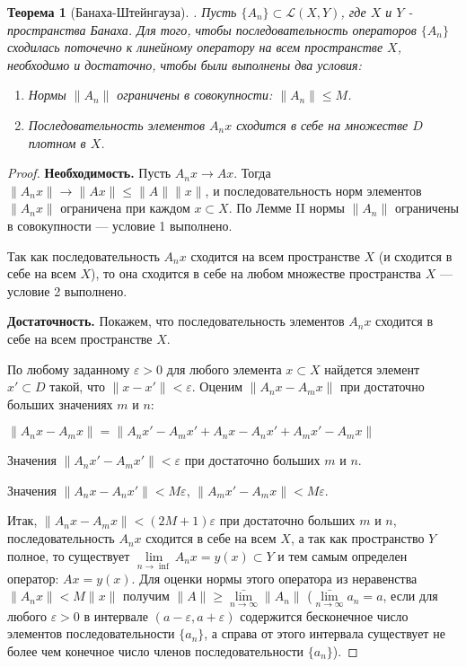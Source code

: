\documentclass[12pt,a4paper,titlepage]{book}
\theoremstyle{definition}
\theoremstyle{plain}
\newtheorem*{theorem}{Теорема}
\theoremstyle{remark}
\theoremstyle{remark}
\theoremstyle{remark}
\theoremstyle{plain}
\begin{document}
\begin{theorem}[Банаха-Штейнгауза].
Пусть $\lbrace A_n\rbrace \subset \mathcal{L}(X,Y)$, где $X$ и $Y$ - пространства Банаха. Для того, чтобы последовательность операторов $\lbrace A_n\rbrace$ сходилась поточечно к линейному оператору на всем пространстве $X$, необходимо и достаточно, чтобы были выполнены два условия:

\begin{enumerate}
\item Нормы $\lVert A_n\rVert$ ограничены в совокупности: $\lVert A_n\rVert \le M$.
\item Последовательность элементов $A_n x$ сходится в себе на множестве $D$ плотном в $X$.
\end{enumerate}
\end{theorem}

\begin{proof}
\textbf{Необходимость.} Пусть $A_n x \to A x$. Тогда $\lVert A_n x\rVert \to \lVert A x\rVert \le \lVert A\rVert \lVert x\rVert$, и последовательность норм элементов $\lVert A_n x\rVert$ ограничена при каждом $x \subset X$. По Лемме II нормы $\lVert A_n\rVert$ ограничены в совокупности --- условие 1 выполнено.

Так как последовательность $A_n x$ сходится на всем пространстве $X$ (и сходится в себе на всем $X$), то она сходится в себе на любом множестве пространства $X$ --- условие 2 выполнено.

\textbf{Достаточность.} Покажем, что последовательность элементов $A_n x$ сходится в себе на всем пространстве $X$.

По любому заданному $\varepsilon > 0$ для любого элемента $x \subset X$ найдется элемент $x' \subset D$ такой, что $\lVert x - x'\rVert < \varepsilon$. Оценим $\lVert A_n x - A_m x\rVert$ при достаточно больших значениях $m$ и $n$:

\begin{center}
$\lVert A_n x - A_m x\rVert = \lVert A_n x' - A_m x' + A_n x - A_n x' + A_m x' - A_m x\rVert$
\end{center}

Значения $\lVert A_n x' - A_m x'\rVert < \varepsilon$ при достаточно больших $m$ и $n$.

Значения $\lVert A_n x - A_n x'\rVert < M\varepsilon$, $\lVert A_m x' - A_m x\rVert < M\varepsilon$.

Итак, $\lVert A_n x - A_m x\rVert < (2M +1)\varepsilon$ при достаточно больших $m$ и $n$, последовательность $A_n x$ сходится в себе на всем $X$, а так как пространство $Y$ полное, то существует $\lim\limits_{n \to \inf} A_n x = y(x) \subset Y$ и тем самым определен оператор: $A x = y(x)$. Для оценки нормы этого оператора из неравенства $\lVert A_n x\rVert < M\lVert x\rVert$ получим $\lVert A\rVert \ge \bar{\lim\limits_{n \to \infty}}\lVert A_n\rVert$ ($\bar{\lim\limits_{n \to \infty}}a_n = a$, если для любого $\varepsilon > 0$ в интервале $(a-\varepsilon, a+\varepsilon)$ содержится бесконечное число элементов последовательности $\lbrace a_n\rbrace$, а справа от этого интервала существует не более чем конечное число членов последовательности $\lbrace a_n\rbrace$).


\end{proof}
\end{document}
